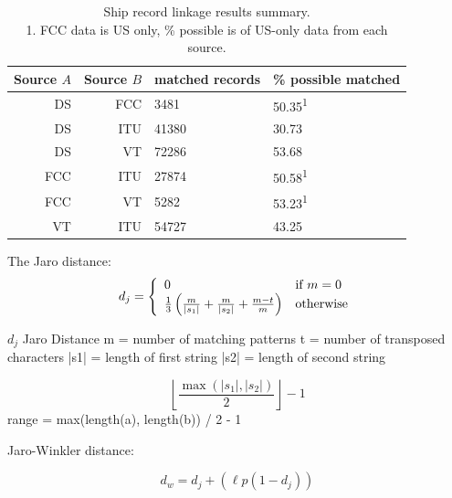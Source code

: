 \begin{table}[htbp]
  \begin{tabular}{rrll} %
    \hline
    Source $A$ & Source $B$ & matched records & \% possible matched \\
    \hline
     DS & FCC &  3481 & 50.35\textsuperscript{1} \\
     DS & ITU & 41380 & 30.73 \\
     DS &  VT & 72286 & 53.68 \\
    FCC & ITU & 27874 & 50.58\textsuperscript{1} \\
    FCC &  VT &  5282 & 53.23\textsuperscript{1} \\
     VT & ITU & 54727 & 43.25 \\
  \end{tabular}
  \caption{Ship record linkage results summary. \\
    1. FCC data is US only, \% possible is of US-only data from each source.}
  \label{table:ships-record-linkage-results-summary}
\end{table}




The Jaro distance:
\begin{equation}
  d_j = \left\{
  \begin{array}{l l}
    0 & \text{if }m = 0 \\ 
    \frac{1}{3}\left(\frac{m}{|s_1|} + \frac{m}{|s_2|} + \frac{m-t}{m}\right) & \text{otherwise} \end{array} \right.
\end{equation}

$ d_j $ Jaro Distance
m = number of matching patterns
t = number of transposed characters
|s1| = length of first string
|s2| = length of second string

\begin{equation}
  \left\lfloor\frac{\max(|s_1|,|s_2|)}{2}\right\rfloor-1
\end{equation}
range = max(length(a), length(b)) / 2 - 1


Jaro-Winkler distance:

\begin{equation}
  d_w = d_j + (\ell p (1 - d_j))
\end{equation}


